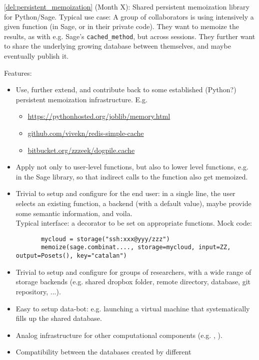 \begin{Workpackage}{\thewpno}
\begin{WPDeliverables}
\begin{itemize}
  \ref{del:persistent_memoization} (Month X): Shared persistent
  memoization library for Python/Sage.  Typical use case: A group of
  collaborators is using intensively a given function (in Sage, or in
  their private code). They want to memoize the results, as with
  e.g. Sage's \lstinline{cached_method}, but across sessions.  They
  further want to share the underlying growing database between
  themselves, and maybe eventually publish it.

  Features:
  \begin{itemize}
  \item Use, further extend, and contribute back to some established
    (Python?) persistent memoization infrastructure. E.g.
    \begin{itemize}
    \item \url{https://pythonhosted.org/joblib/memory.html}
    \item \url{github.com/vivekn/redis-simple-cache}
    \item \url{bitbucket.org/zzzeek/dogpile.cache}
    \end{itemize}
  \item Apply not only to user-level functions, but also to lower
    level functions, e.g. in the Sage library, so that indirect calls
    to the function also get memoized.
  \item Trivial to setup and configure for the end user: in a single
    line, the user selects an existing function, a backend (with a
    default value), maybe provide some semantic information, and
    voila. \\
    Typical interface: a decorator to be set on appropriate functions.
    Mock code:
    \begin{lstlisting}
       mycloud = storage("ssh:xxx@yyy/zzz")
       memoize(sage.combinat...., storage=mycloud, input=ZZ, output=Posets(), key="catalan")
    \end{lstlisting}
     \item Trivial to setup and configure for groups of researchers, with
    a wide range of storage backends (e.g. shared dropbox folder,
    remote directory, database, git repository, ...).
  \item Easy to setup data-bot: e.g. launching a virtual machine that
    systematically fills up the shared database.
  \item Analog infrastructure for other computational components
    (e.g. \GAP, \Singular).
  \item Compatibility between the databases created by different

\end{itemize}
\end{itemize}
\end{WPDeliverables}
\end{Workpackage}
